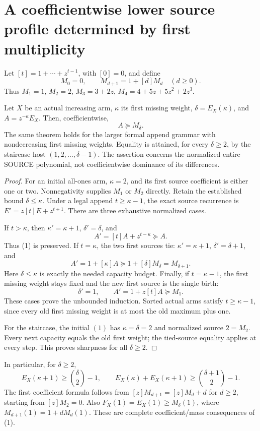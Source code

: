 \section{A coefficientwise lower source profile determined by first multiplicity}
Let $[t]=1+\cdots+z^{t-1}$, with $[0]=0$, and define
\[
 M_0=0,\qquad M_{d+1}=1+[d]M_d\quad(d\ge0).
\]
Thus $M_1=1$, $M_2=2$, $M_3=3+2z$,
$M_4=4+5z+5z^2+2z^3$.

\begin{theorem}
Let $X$ be an actual increasing arm, $\kappa$ its first missing
weight, $\delta=E_X(\kappa)$, and $A=z^{-\kappa}E_X$.
Then, coefficientwise,
\[
                                A\succeq M_\delta.      \tag{1}
\]
The same theorem holds for the larger formal append grammar with
nondecreasing first missing weights. Equality is attained, for
every $\delta\ge2$, by the staircase host $(1,2,\ldots,\delta-1)$.
The assertion concerns the normalized entire SOURCE polynomial,
not coefficientwise dominance of its differences.
\end{theorem}
\begin{proof}
For an initial all-ones arm, $\kappa=2$, and its first source
coefficient is either one or two. Nonnegativity supplies $M_1$
or $M_2$ directly. Retain the established bound $\delta\le\kappa$.
Under a legal append $t\ge\kappa-1$, the exact source recurrence is
$E'=z[t]E+z^{t+1}$. There are three exhaustive normalized cases.

If $t>\kappa$, then $\kappa'=\kappa+1$, $\delta'=\delta$, and
\[
                         A'=[t]A+z^{t-\kappa}\succeq A.
\]
Thus (1) is preserved. If $t=\kappa$, the two first sources tie:
$\kappa'=\kappa+1$, $\delta'=\delta+1$, and
\[
 A'=1+[\kappa]A\succeq1+[\delta]M_\delta=M_{\delta+1}.
\]
Here $\delta\le\kappa$ is exactly the needed capacity budget.
Finally, if $t=\kappa-1$, the first missing weight stays fixed
and the new first source is the single birth:
\[
                 \delta'=1,\qquad A'=1+z[t]A\succeq M_1.
\]
These cases prove the unbounded induction. Sorted actual arms
satisfy $t\ge\kappa-1$, since every old first missing weight is
at most the old maximum plus one.

For the staircase, the initial $(1)$ has $\kappa=\delta=2$
and normalized source $2=M_2$. Every next capacity equals the
old first weight; the tied-source equality applies at every step.
This proves sharpness for all $\delta\ge2$.
\end{proof}

In particular, for $\delta\ge2$,
\[
 E_X(\kappa+1)\ge\binom\delta2-1,\qquad
 E_X(\kappa)+E_X(\kappa+1)\ge\binom{\delta+1}{2}-1.
\]
The first coefficient formula follows from
$[z]M_{d+1}=[z]M_d+d$ for $d\ge2$, starting from $[z]M_2=0$.
Also $F_X(1)=E_X(1)\ge M_\delta(1)$, where
$M_{d+1}(1)=1+dM_d(1)$.
These are complete coefficient/mass consequences of (1).

